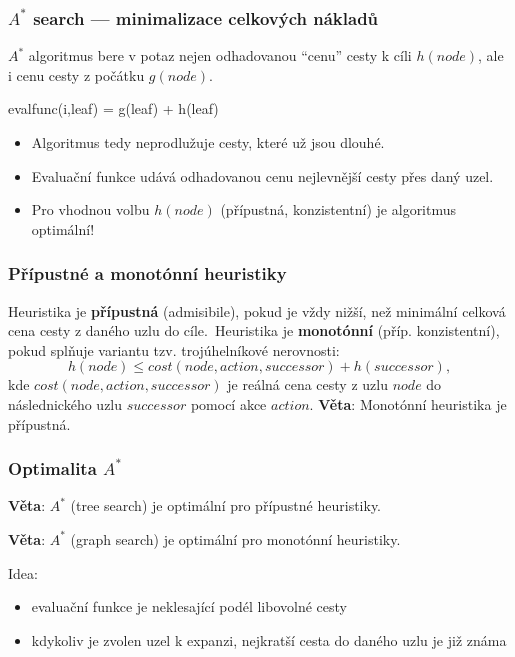 \documentclass[red,handout,professionalfont]{beamer}
\theoremstyle{definition}
\newcommand{\0}{\mbox{${\bf 0}$}}
\renewcommand{\emph}[1]{{\bf #1}}
\begin{document}
\begin{frame}\frametitle{$A^*$ search --- minimalizace celkových nákladů}
 $A^*$ algoritmus bere v potaz nejen odhadovanou ``cenu'' cesty k cíli $h(node)$\pause, ale i cenu cesty z počátku $g(node)$.\pause

\begin{center}
 evalfunc(i,leaf) = g(leaf) + h(leaf)
\end{center}

\begin{itemize}
 \item Algoritmus tedy neprodlužuje cesty, které už jsou dlouhé.\pause
 \item Evaluační funkce udává odhadovanou cenu \alert{nejlevnější cesty} přes daný uzel.\pause
 \item Pro vhodnou volbu $h(node)$ (přípustná, konzistentní) je algoritmus optimální!
\end{itemize}
\end{frame}

\begin{frame}\frametitle{Přípustné a monotónní heuristiky}
  Heuristika je \emph{přípustná} (admisibile)\pause, pokud je vždy nižší, než minimální celková cena cesty z daného uzlu do cíle.\pause\ Heuristika
  je \emph{monotónní} (příp. konzistentní)\pause, pokud splňuje variantu tzv. trojúhelníkové nerovnosti:
  \begin{displaymath}
   h(node) \leq cost(node,action,successor) + h(successor),
  \end{displaymath}\pause
  kde $cost(node,action,successor)$ je reálná cena cesty z uzlu $node$ do následnického uzlu $successor$ pomocí akce $action$.\pause
  \vskip1cm
  \emph{Věta}: Monotónní heuristika je přípustná.
\end{frame}

\begin{frame}\frametitle{Optimalita $A^*$}
  \emph{Věta}: $A^*$ (tree search) je optimální pro přípustné heuristiky.\pause

  \medskip

  \emph{Věta}: $A^*$ (graph search) je optimální pro monotónní heuristiky.\pause

  \medskip

  Idea:\pause
  \begin{itemize}
   \item evaluační funkce je neklesající podél libovolné cesty\pause
   \item kdykoliv je zvolen uzel k expanzi, nejkratší cesta do daného uzlu je již známa
  \end{itemize}
\end{frame}
\end{document}
